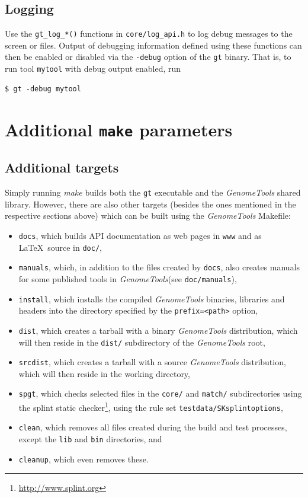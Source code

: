 \documentclass[11pt,final]{article}
\newcommand{\keyword}[1]{\lstinline{#1}}
\newcommand{\Gt}[0]{\emph{GenomeTools}\xspace}
\begin{document}
\subsection{Logging}

Use the \keyword{gt_log_*()} functions in \keyword{core/log_api.h} to log debug
messages to the screen or files. Output of debugging information defined using
these functions can then be enabled or disabled via the \keyword{-debug} option
of the \keyword{gt} binary. That is, to run tool \keyword{mytool} with debug
output enabled, run

\begin{lstlisting}
$ gt -debug mytool
\end{lstlisting}%

\section{Additional \keyword{make} parameters}

\subsection{Additional targets}
Simply running \emph{make} builds both the \keyword{gt} executable and the
\Gt shared library. However, there are also other targets (besides the ones
mentioned in the respective sections above) which can be built using the \Gt
Makefile:
\begin{itemize}
\item
\keyword{docs}, which builds API documentation as web pages in \keyword{www} and
as \LaTeX\ source in \keyword{doc/},
\item
\keyword{manuals}, which, in addition to the files created by \keyword{docs},
also creates manuals for some published tools in \Gt (see
\keyword{doc/manuals}),
\item
\keyword{install}, which installs the compiled \Gt binaries, libraries and
headers into the directory specified by the \keyword{prefix=<path>} option,
\item
\keyword{dist}, which creates a tarball with a binary \Gt distribution, which
will then reside in the \keyword{dist/} subdirectory of the \Gt root,
\item
\keyword{srcdist}, which creates a tarball with a source \Gt distribution, which
will then reside in the working directory,
\item
\keyword{spgt}, which checks selected files in the \keyword{core/} and
\keyword{match/} subdirectories using the splint static
checker\footnote{\url{http://www.splint.org}}, using the rule set
\keyword{testdata/SKsplintoptions},
\item
\keyword{clean}, which removes all files created during the build and test
processes, except the \keyword{lib} and \keyword{bin} directories, and
\item
\keyword{cleanup}, which even removes these.
\end{itemize}
\end{document}
